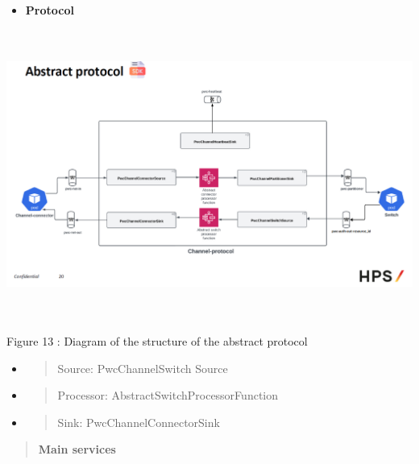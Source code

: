 \documentclass[12pt,a4paper]{report}
\begin{document}
\begin{itemize}
\item
  \textbf{Protocol}
\end{itemize}

\includegraphics[width=6.71322in,height=3.73766in]{vertopal_d1b0b2209edd4c6aa8254f57daa0953b/media/image32.png}

\protect\hypertarget{_Toc201954489}{}{}Figure 13 : Diagram of the
structure of the abstract protocol

\begin{itemize}
\item
  \begin{quote}
  Source: PwcChannelSwitch Source
  \end{quote}
\item
  \begin{quote}
  Processor: AbstractSwitchProcessorFunction
  \end{quote}
\item
  \begin{quote}
  Sink: PwcChannelConnectorSink
  \end{quote}
\end{itemize}

\begin{quote}
\textbf{Main services}
\end{quote}
\end{document}
